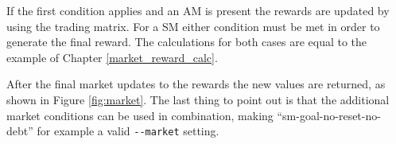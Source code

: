 
If the first condition applies and an AM is present the rewards are updated by using the trading matrix. For a SM either condition must be met in order to generate the final reward. The calculations for both cases are equal to the example of Chapter \ref{market_reward_calc}.

After the final market updates to the rewards the new values are returned, as shown in Figure \ref{fig:market}. The last thing to point out is that the additional market conditions can be used in combination, making ``sm-goal-no-reset-no-debt'' for example a valid \verb|--market| setting.